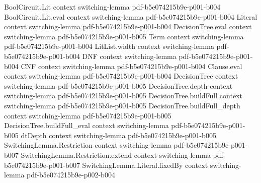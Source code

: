 \begin{lemma}
\label{LMN.switched_gates_have_dnf_cnf}
\leanok
{}
\proofstep
  {BoolCircuit.Lit}
  {context}
  {switching-lemma}
  {pdf-b5e074215b9e-p001-b004}
\proofstep
  {BoolCircuit.Lit.eval}
  {context}
  {switching-lemma}
  {pdf-b5e074215b9e-p001-b004}
\proofstep
  {Literal}
  {context}
  {switching-lemma}
  {pdf-b5e074215b9e-p001-b004}
\proofstep
  {DecisionTree.eval}
  {context}
  {switching-lemma}
  {pdf-b5e074215b9e-p001-b005}
\proofstep
  {Term}
  {context}
  {switching-lemma}
  {pdf-b5e074215b9e-p001-b004}
\proofstep
  {LitList.width}
  {context}
  {switching-lemma}
  {pdf-b5e074215b9e-p001-b004}
\proofstep
  {DNF}
  {context}
  {switching-lemma}
  {pdf-b5e074215b9e-p001-b004}
\proofstep
  {CNF}
  {context}
  {switching-lemma}
  {pdf-b5e074215b9e-p001-b004}
\proofstep
  {Clause.eval}
  {context}
  {switching-lemma}
  {pdf-b5e074215b9e-p001-b004}
\proofstep
  {DecisionTree}
  {context}
  {switching-lemma}
  {pdf-b5e074215b9e-p001-b005}
\proofstep
  {DecisionTree.depth}
  {context}
  {switching-lemma}
  {pdf-b5e074215b9e-p001-b005}
\proofstep
  {DecisionTree.buildFull}
  {context}
  {switching-lemma}
  {pdf-b5e074215b9e-p001-b005}
\proofstep
  {DecisionTree.buildFull_depth}
  {context}
  {switching-lemma}
  {pdf-b5e074215b9e-p001-b005}
\proofstep
  {DecisionTree.buildFull_eval}
  {context}
  {switching-lemma}
  {pdf-b5e074215b9e-p001-b005}
\proofstep
  {dtDepth}
  {context}
  {switching-lemma}
  {pdf-b5e074215b9e-p001-b005}
\proofstep
  {SwitchingLemma.Restriction}
  {context}
  {switching-lemma}
  {pdf-b5e074215b9e-p001-b007}
\proofstep
  {SwitchingLemma.Restriction.extend}
  {context}
  {switching-lemma}
  {pdf-b5e074215b9e-p001-b007}
\proofstep
  {SwitchingLemma.Literal.fixedBy}
  {context}
  {switching-lemma}
  {pdf-b5e074215b9e-p002-b004}

\end{lemma}
